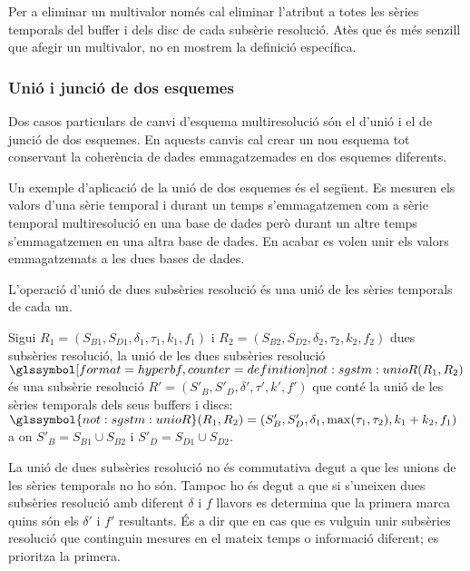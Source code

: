Per a eliminar un multivalor només cal eliminar l'atribut a totes les
sèries temporals del buffer i dels disc de cada subsèrie resolució.
Atès que és més senzill que afegir un multivalor, no en mostrem la
definició específica.


\subsubsection{Unió i junció de dos esquemes}



Dos casos particulars de canvi d'esquema multiresolució són el d'unió
i el de junció de dos esquemes. En aquests canvis cal crear un nou
esquema tot conservant la coherència de dades emmagatzemades en dos
esquemes diferents.

Un exemple d'aplicació de la unió de dos esquemes és el següent. Es
mesuren els valors d'una sèrie temporal i durant un temps
s'emmagatzemen com a sèrie temporal multiresolució en una base de
dades però durant un altre temps s'emmagatzemen en una altra base de
dades. En acabar es volen unir els valors emmagatzemats a les dues
bases de dades.



L'operació d'unió de dues subsèries resolució és una unió de les
sèries temporals de cada un.
\begin{definition}
  Sigui $R_1=(S_{B1},S_{D1},\delta_1,\tau_1,k_1,f_1)$ i
  $R_2=(S_{B2},S_{D2},\delta_2,\tau_2,k_2,f_2)$ dues subsèries
  resolució, la unió de les dues subsèries resolució
  $\glssymboldef{not:sgstm:unioR}(R_1,R_2)$ és una subsèrie resolució $R' =
  (S'_B,S'_D,\delta',\tau',k',f')$ que conté la unió de les sèries
  temporals dels seus buffers i discs: $\glssymbol{not:sgstm:unioR}(R_1,R_2)=
  (S'_B,S'_D,\delta_1,\max(\tau_1,\tau_2),k_1+k_2,f_1)$ a on $S'_B =
  S_{B1} \cup S_{B2}$ i $S'_D = S_{D1} \cup S_{D2}$.
\end{definition}
La unió de dues subsèries resolució no és commutativa degut a que les
unions de les sèries temporals no ho són. Tampoc ho és degut a que si
s'uneixen dues subsèries resolució amb diferent $\delta$ i $f$ llavors
es determina que la primera marca quins són els $\delta'$ i $f'$
resultants.  És a dir que en cas que es vulguin unir subsèries
resolució que continguin mesures en el mateix temps o informació
diferent; es prioritza la primera.


